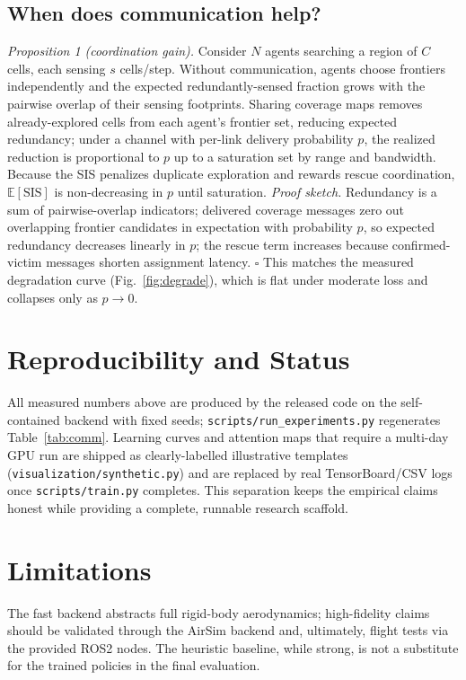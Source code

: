 \documentclass[twocolumn,10pt]{article}
\begin{document}
\subsection{When does communication help?}
\emph{Proposition 1 (coordination gain).} Consider $N$ agents searching a region of $C$
cells, each sensing $s$ cells/step. Without communication, agents choose frontiers
independently and the expected redundantly-sensed fraction grows with the pairwise
overlap of their sensing footprints. Sharing coverage maps removes already-explored
cells from each agent's frontier set, reducing expected redundancy; under a channel with
per-link delivery probability $p$, the realized reduction is proportional to $p$ up to a
saturation set by range and bandwidth. Because the SIS penalizes duplicate exploration and
rewards rescue coordination, $\mathbb{E}[\mathrm{SIS}]$ is non-decreasing in $p$ until
saturation. \emph{Proof sketch.} Redundancy is a sum of pairwise-overlap indicators;
delivered coverage messages zero out overlapping frontier candidates in expectation with
probability $p$, so expected redundancy decreases linearly in $p$; the rescue term
increases because confirmed-victim messages shorten assignment latency. $\square$ This
matches the measured degradation curve (Fig.~\ref{fig:degrade}), which is flat under
moderate loss and collapses only as $p\!\to\!0$.

\section{Reproducibility and Status}\label{sec:status}
All measured numbers above are produced by the released code on the self-contained
backend with fixed seeds; \texttt{scripts/run\_experiments.py} regenerates
Table~\ref{tab:comm}. Learning curves and attention maps that require a multi-day
GPU run are shipped as clearly-labelled illustrative templates
(\texttt{visualization/synthetic.py}) and are replaced by real TensorBoard/CSV logs
once \texttt{scripts/train.py} completes. This separation keeps the empirical claims
honest while providing a complete, runnable research scaffold.

\section{Limitations}
The fast backend abstracts full rigid-body aerodynamics; high-fidelity claims
should be validated through the AirSim backend and, ultimately, flight tests via
the provided ROS2 nodes. The heuristic baseline, while strong, is not a substitute
for the trained policies in the final evaluation.
\end{document}
